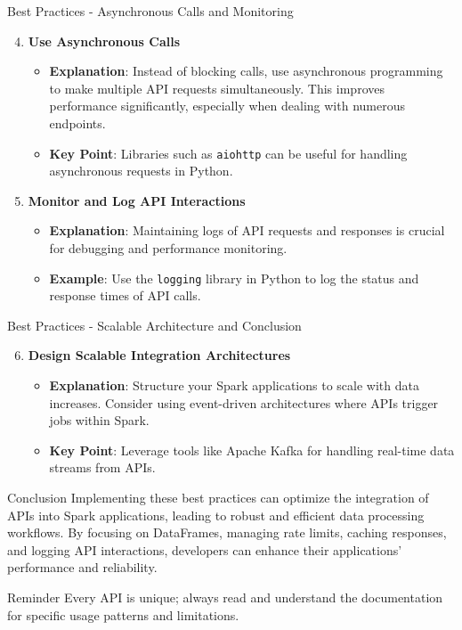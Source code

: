\documentclass[aspectratio=169]{beamer}
\begin{document}
\begin{frame}{Best Practices - Asynchronous Calls and Monitoring}
    \begin{enumerate}
        \setcounter{enumi}{3}
        \item \textbf{Use Asynchronous Calls}
        \begin{itemize}
            \item \textbf{Explanation}: Instead of blocking calls, use asynchronous programming to make multiple API requests simultaneously. This improves performance significantly, especially when dealing with numerous endpoints.
            \item \textbf{Key Point}: Libraries such as \texttt{aiohttp} can be useful for handling asynchronous requests in Python.
        \end{itemize}
        
        \item \textbf{Monitor and Log API Interactions}
        \begin{itemize}
            \item \textbf{Explanation}: Maintaining logs of API requests and responses is crucial for debugging and performance monitoring.
            \item \textbf{Example}: Use the \texttt{logging} library in Python to log the status and response times of API calls.
        \end{itemize}
    \end{enumerate}
\end{frame}

\begin{frame}{Best Practices - Scalable Architecture and Conclusion}
    \begin{enumerate}
        \setcounter{enumi}{5}
        \item \textbf{Design Scalable Integration Architectures}
        \begin{itemize}
            \item \textbf{Explanation}: Structure your Spark applications to scale with data increases. Consider using event-driven architectures where APIs trigger jobs within Spark.
            \item \textbf{Key Point}: Leverage tools like Apache Kafka for handling real-time data streams from APIs.
        \end{itemize}
    \end{enumerate}

    \begin{block}{Conclusion}
        Implementing these best practices can optimize the integration of APIs into Spark applications, leading to robust and efficient data processing workflows. By focusing on DataFrames, managing rate limits, caching responses, and logging API interactions, developers can enhance their applications' performance and reliability.
    \end{block}  

    \begin{block}{Reminder}
        Every API is unique; always read and understand the documentation for specific usage patterns and limitations.
    \end{block}
\end{frame}
\end{document}
